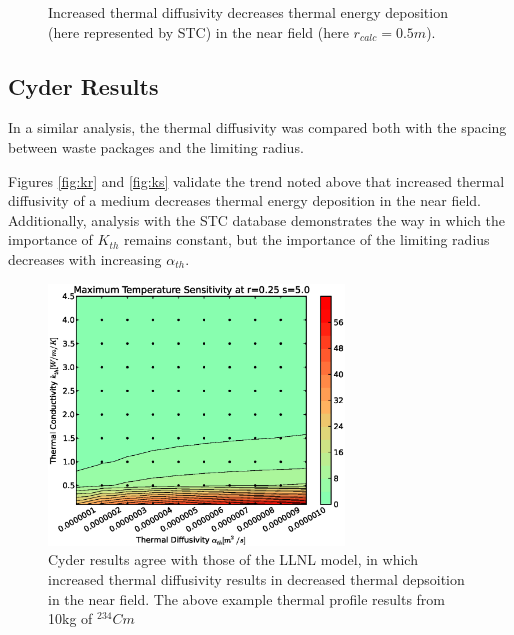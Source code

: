 \begin{figure}[htbp!]
\begin{center}
\end{center}
\caption[$K_{th}$ Sensitivity for High $\alpha_{th}$]{Increased thermal diffusivity decreases thermal energy deposition 
(here represented by \gls{STC}) in the near field (here $r_{calc} = 0.5m$).}
\label{fig:Cm242alpha_kth_high}
\end{figure}


\FloatBarrier
\subsection{Cyder Results}

In a similar analysis, the thermal diffusivity was compared both with the 
spacing between waste packages and the limiting radius. 

Figures \ref{fig:kr} and \ref{fig:ks} validate the trend noted above that 
increased thermal diffusivity of a medium decreases thermal energy deposition 
in the near field.  Additionally, analysis with the \Cyder STC database 
demonstrates the way in which the importance of $K_{th}$ remains constant, but 
the importance of the limiting radius decreases with increasing $\alpha_{th}$.

\begin{figure}[htbp!]
\begin{center}
\includegraphics[width=0.7\textwidth]{./chapters/demonstration/diffusivity/ak.eps}
\end{center}
\caption[$\alpha_{th}$ vs. $K_{th}$ Sensitivity in Cyder]{Cyder results agree 
with those of the LLNL model, in which increased thermal diffusivity results in 
decreased thermal depsoition in the near field. The above example thermal 
profile results from 10kg of $^{234}Cm$} 
\label{fig:ar}
\end{figure}


